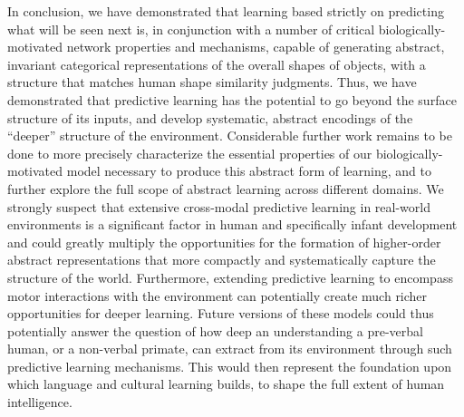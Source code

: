 \documentclass[11pt,twoside]{article}
\newif\myifpdf
\begin{document}
In conclusion, we have demonstrated that learning based strictly on predicting what will be seen next is, in conjunction with a number of critical biologically-motivated network properties and mechanisms, capable of generating abstract, invariant categorical representations of the overall shapes of objects, with a structure that matches human shape similarity judgments.  Thus, we have demonstrated that predictive learning has the potential to go beyond the surface structure of its inputs, and develop systematic, abstract encodings of the “deeper” structure of the environment.  Considerable further work remains to be done to more precisely characterize the essential properties of our biologically-motivated model necessary to produce this abstract form of learning, and to further explore the full scope of abstract learning across different domains.  We strongly suspect that extensive cross-modal predictive learning in real-world environments is a significant factor in human and specifically infant development and could greatly multiply the opportunities for the formation of higher-order abstract representations that more compactly and systematically capture the structure of the world.  Furthermore, extending predictive learning to encompass motor interactions with the environment can potentially create much richer opportunities for deeper learning.  Future versions of these models could thus potentially answer the question of how deep an understanding a pre-verbal human, or a non-verbal primate, can extract from its environment through such predictive learning mechanisms.  This would then represent the foundation upon which language and cultural learning builds, to shape the full extent of human intelligence.


\end{document}
